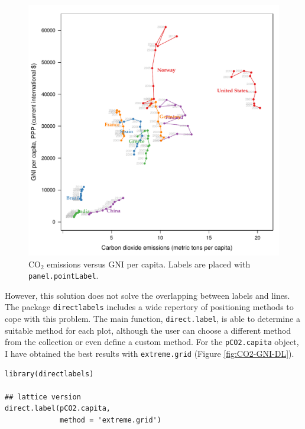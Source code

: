 \begin{figure}[htbp]
\centering
\includegraphics[width=.9\linewidth]{figs/CO2_capita.pdf}
\caption{\(\mathrm{CO_2}\) emissions versus GNI per capita. Labels are placed with \texttt{panel.pointLabel}. \label{fig:CO2-GNI-glayer}}
\end{figure}

However, this solution does not solve the overlapping between labels
and lines. The package \texttt{directlabels} \cite{Hocking2013} includes a
wide repertory of positioning methods to cope with this problem. The
main function, \texttt{direct.label}, is able to determine a suitable method
for each plot, although the user can choose a different method from
the collection or even define a custom method. For the \texttt{pCO2.capita}
object, I have obtained the best results with \texttt{extreme.grid} (Figure
\ref{fig:CO2-GNI-DL}).


\lstset{language=r,label= ,caption= ,captionpos=b,numbers=none}
\begin{lstlisting}
library(directlabels)

## lattice version
direct.label(pCO2.capita,
             method = 'extreme.grid')
\end{lstlisting}

